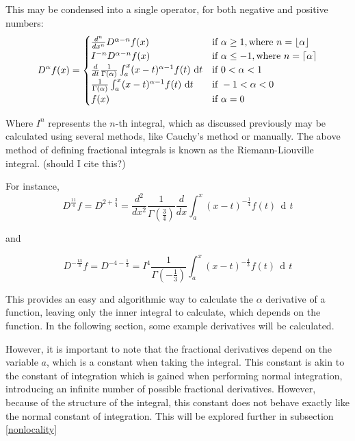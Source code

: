 \documentclass{article}
\DeclareMathOperator{\di}{\,d\!}
\DeclarePairedDelimiter\ceil{\lceil}{\rceil}
\DeclarePairedDelimiter\floor{\lfloor}{\rfloor}
\begin{document}
This may be condensed into a single operator, for both negative and positive
numbers:
\begin{equation*}
	D^\alpha f(x) =
	\begin{cases}
		\frac{d^n}{dx^n} D^{\alpha - n} f(x)
		& \text{if } \alpha \geq 1, \text{where } n = \floor{\alpha}\\

		I^{-n}D^{\alpha - n} f(x)
		& \text{if } \alpha \leq -1, \text{where } n = \ceil{\alpha} \\

		\frac{d}{dt} \frac{1}{\Gamma\left(\alpha\right)} \int_a^x (x-t)^{\alpha-1} f(t) \di t
		& \text{if } 0 < \alpha < 1 \\

		\frac{1}{\Gamma\left(\alpha\right)} \int_a^x (x-t)^{\alpha-1} f(t) \di t
		& \text{if } -1 < \alpha < 0 \\

		f(x) & \text{if } \alpha = 0
	\end{cases}
\end{equation*}

Where $I^n$ represents the $n$-th integral, which as discussed previously may
be calculated using several methods, like Cauchy's method or manually. The
above method of defining fractional integrals is known as the Riemann-Liouville
integral. (should I cite this?)

For instance,
$$
D^{\frac{11}{4}} f = D^{2+\frac{3}{4}}
				 = \frac{d^2}{dx^2}\frac{1}{\Gamma\left(\frac{3}{4}\right)}
				 \frac{d}{dx} \int_a^x\left(x-t\right)^{-\frac{1}{4}} f(t) \di t
$$

and

$$
D^{-\frac{13}{3}} f = D^{-4-\frac{1}{3}}
					= I^4 \frac{1}{\Gamma\left(-\frac{1}{3}\right)} \int_a^x \left(x-t\right)^{-\frac{4}{3}} f(t) \di t
$$

This provides an easy and algorithmic way to calculate the $\alpha$ derivative
of a function, leaving only the inner integral to calculate, which depends on
the function. In the following section, some example derivatives will be
calculated.

However, it is important to note that the fractional derivatives depend on the
variable $a$, which is a constant when taking the integral. This constant is
akin to the constant of integration which is gained when performing normal
integration, introducing an infinite number of possible fractional derivatives.
However, because of the structure of the integral, this constant does not behave
exactly like the normal constant of integration. This will be explored further in subsection \ref{nonlocality}
\end{document}
